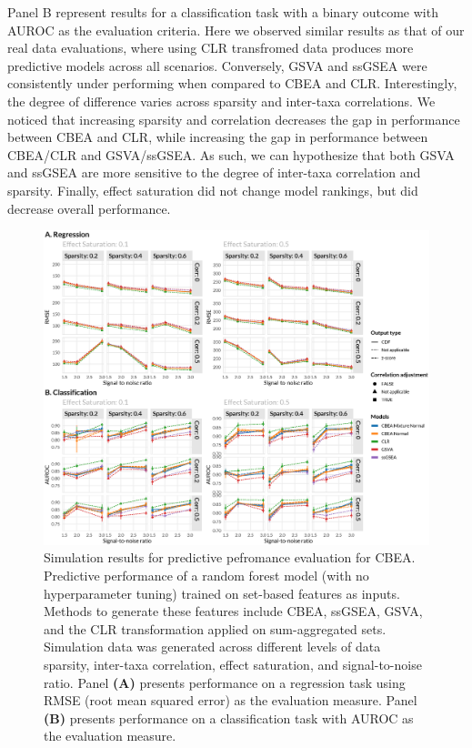 Panel B represent results for a classification task with a binary outcome with AUROC as the evaluation criteria. Here we observed similar results as that of our real data evaluations, where using CLR transfromed data produces more predictive models across all scenarios. Conversely, GSVA and ssGSEA were consistently under performing when compared to CBEA and CLR. Interestingly, the degree of difference varies across sparsity and inter-taxa correlations. We noticed that increasing sparsity and correlation decreases the gap in performance between CBEA and CLR, while increasing the gap in performance between CBEA/CLR and GSVA/ssGSEA. As such, we can hypothesize that both GSVA and ssGSEA are more sensitive to the degree of inter-taxa correlation and sparsity. Finally, effect saturation did not change model rankings, but did decrease overall performance.  


\begin{figure}[!h]
    \centering
    \includegraphics[width=\linewidth]{figures/appC_fs5.eps}
    \caption[Simulation results for predictive pefromance evaluation for CBEA]{Simulation results for predictive pefromance evaluation for CBEA. Predictive performance of a random forest model (with no hyperparameter tuning) trained on set-based features as inputs. Methods to generate these features include CBEA, ssGSEA, GSVA, and the CLR transformation applied on sum-aggregated sets. Simulation data was generated across different levels of data sparsity, inter-taxa correlation, effect saturation, and signal-to-noise ratio. Panel \textbf{(A)} presents performance on a regression task using RMSE (root mean squared error) as the evaluation measure. Panel \textbf{(B)} presents performance on a classification task with AUROC as the evaluation measure.}
    \label{fig:c5}
\end{figure}

